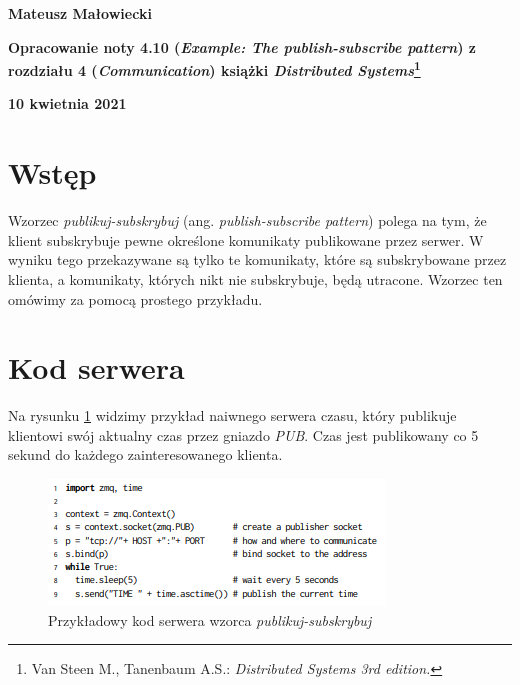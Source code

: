 \documentclass[10pt, a4paper]{article}
\begin{document}
\begin{titlepage}
\begin{center}
\large
\textbf{Mateusz Małowiecki}

\vspace{0.4cm}
\Large
\textbf{Opracowanie noty 4.10 (\textit{Example: The publish-subscribe pattern}) z rozdziału 4 (\textit{Communication}) książki \textit{Distributed Systems}\footnote{Van Steen M., Tanenbaum A.S.: \textit{ Distributed Systems 3rd edition.}}}

\vspace{0.4cm}
\large
\textbf{10 kwietnia 2021}
\end{center}
\end{titlepage}
\section*{Wstęp}
Wzorzec \textit{publikuj-subskrybuj} (ang. \textit{publish-subscribe pattern}) polega na tym, że klient subskrybuje pewne określone komunikaty publikowane przez serwer. W wyniku tego przekazywane są tylko te komunikaty, które są subskrybowane przez klienta, a komunikaty, których nikt nie subskrybuje, będą utracone. Wzorzec ten omówimy za pomocą prostego przykładu.
\section*{Kod serwera}
Na rysunku \ref{fig:mesh1} widzimy przykład naiwnego serwera czasu, który publikuje klientowi swój aktualny czas przez gniazdo \textit{PUB}. Czas jest publikowany co 5 sekund do każdego zainteresowanego klienta.
\begin{figure}[H]
\includegraphics{ps_server}
\caption{Przykładowy kod serwera wzorca \textit{publikuj-subskrybuj}}
\label{fig:mesh1}
\end{figure}
\end{document}
